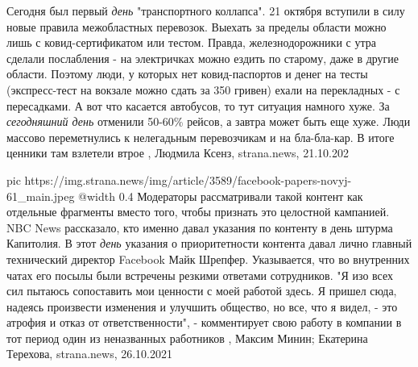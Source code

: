 Сегодня был первый \emph{день} "транспортного коллапса". 21 октября вступили в силу
новые правила межобластных перевозок. Выехать за пределы области можно лишь с
ковид-сертификатом или тестом. Правда, железнодорожники с утра сделали
послабления - на электричках можно ездить по старому, даже в другие области.
Поэтому люди, у которых нет ковид-паспортов и денег на тесты (экспресс-тест на
вокзале можно сдать за 350 гривен) ехали на перекладных - с пересадками.  А вот
что касается автобусов, то тут ситуация намного хуже. За \emph{сегодняшний день}
отменили 50-60\% рейсов, а завтра может быть еще хуже. Люди массово
переметнулись к нелегадьным перевозчикам и на бла-бла-кар. В итоге ценники там
взлетели втрое
, Людмила Ксенз, strana.news, 21.10.202

\ifcmt
  pic https://img.strana.news/img/article/3589/facebook-papers-novyj-61_main.jpeg
  @width 0.4
\fi
Модераторы рассматривали такой контент как отдельные фрагменты вместо того,
чтобы признать это целостной кампанией.  NBC News рассказало, кто именно давал
указания по контенту в день штурма Капитолия.  В этот \emph{день} указания о
приоритетности контента давал лично главный технический директор Facebook Майк
Шрепфер. Указывается, что во внутренних чатах его посылы были встречены резкими
ответами сотрудников.  "Я изо всех сил пытаюсь сопоставить мои ценности с моей
работой здесь. Я пришел сюда, надеясь произвести изменения и улучшить общество,
но все, что я видел, - это атрофия и отказ от ответственности", - комментирует
свою работу в компании в тот период один из неназванных работников
, 
Максим Минин; Екатерина Терехова, strana.news, 26.10.2021

